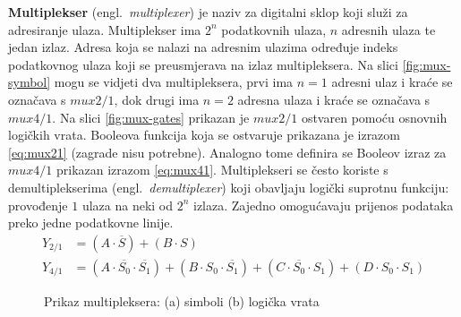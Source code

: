\documentclass[times, utf8, diplomski]{fer}
\begin{document}
\textbf{Multiplekser} (engl.~\textit{multiplexer}) je naziv za digitalni sklop koji služi za adresiranje ulaza. Multiplekser ima $2^{n}$ podatkovnih ulaza, $n$ adresnih ulaza te jedan izlaz. Adresa koja se nalazi na adresnim ulazima određuje indeks podatkovnog ulaza koji se preusmjerava na izlaz multipleksera. Na slici \ref{fig:mux-symbol} mogu se vidjeti dva multipleksera, prvi ima $n=1$ adresni ulaz i kraće se označava s $mux2/1$, dok drugi ima $n=2$ adresna ulaza i kraće se označava s $mux4/1$. Na slici \ref{fig:mux-gates} prikazan je $mux2/1$ ostvaren pomoću osnovnih logičkih vrata. Booleova funkcija koja se ostvaruje prikazana je izrazom \ref{eq:mux21} (zagrade nisu potrebne). Analogno tome definira se Booleov izraz za $mux4/1$ prikazan izrazom \ref{eq:mux41}. Multiplekseri se često koriste s demultiplekserima (engl.~\textit{demultiplexer}) koji obavljaju logički suprotnu funkciju: provođenje $1$ ulaza na neki od $2^{n}$ izlaza. Zajedno omogućavaju prijenos podataka preko jedne podatkovne linije.
%
\begin{align}
	\label{eq:mux21}
	Y_{2/1} &= (A \cdot \overline{S}) + (B \cdot S) \\
	\label{eq:mux41}
	Y_{4/1} &= (A \cdot \overline{S_{0}} \cdot \overline{S_{1}}) + (B \cdot S_{0} \cdot \overline{S_{1}}) + (C \cdot \overline{S_{0}} \cdot S_{1}) + (D \cdot S_{0} \cdot S_{1})
\end{align}

\begin{figure}[htb]
	\hspace{\fill}
	\caption{Prikaz multipleksera: (a) simboli (b) logička vrata}
	\label{fig:mux}
\end{figure}
\end{document}
